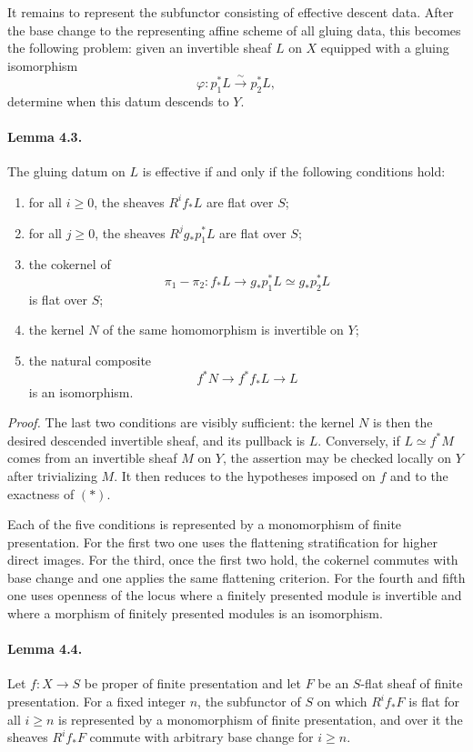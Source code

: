 \documentclass[12pt]{article}
\newcommand{\iso}{\xrightarrow{\sim}}
\begin{document}
It remains to represent the subfunctor consisting of effective descent data. After the base change to the representing affine scheme of all gluing data, this becomes the following problem: given an invertible sheaf $L$ on $X$ equipped with a gluing isomorphism
\[
\varphi:p_1^*L\iso p_2^*L,
\]
determine when this datum descends to $Y$.

\paragraph{Lemma 4.3.}
The gluing datum on $L$ is effective if and only if the following conditions hold:
\begin{enumerate}[label=\arabic*)]
\item for all $i\geq0$, the sheaves $R^if_*L$ are flat over $S$;
\item for all $j\geq0$, the sheaves $R^jg_*p_1^*L$ are flat over $S$;
\item the cokernel of
\[
\pi_1-\pi_2:f_*L\to g_*p_1^*L\simeq g_*p_2^*L
\]
is flat over $S$;
\item the kernel $N$ of the same homomorphism is invertible on $Y$;
\item the natural composite
\[
f^*N\to f^*f_*L\to L
\]
is an isomorphism.
\end{enumerate}

\emph{Proof.}
The last two conditions are visibly sufficient: the kernel $N$ is then the desired descended invertible sheaf, and its pullback is $L$. Conversely, if $L\simeq f^*M$ comes from an invertible sheaf $M$ on $Y$, the assertion may be checked locally on $Y$ after trivializing $M$. It then reduces to the hypotheses imposed on $f$ and to the exactness of $(*)$.

Each of the five conditions is represented by a monomorphism of finite presentation. For the first two one uses the flattening stratification for higher direct images. For the third, once the first two hold, the cokernel commutes with base change and one applies the same flattening criterion. For the fourth and fifth one uses openness of the locus where a finitely presented module is invertible and where a morphism of finitely presented modules is an isomorphism.

\paragraph{Lemma 4.4.}
Let $f:X\to S$ be proper of finite presentation and let $F$ be an $S$-flat sheaf of finite presentation. For a fixed integer $n$, the subfunctor of $S$ on which $R^if_*F$ is flat for all $i\geq n$ is represented by a monomorphism of finite presentation, and over it the sheaves $R^if_*F$ commute with arbitrary base change for $i\geq n$.
\end{document}
